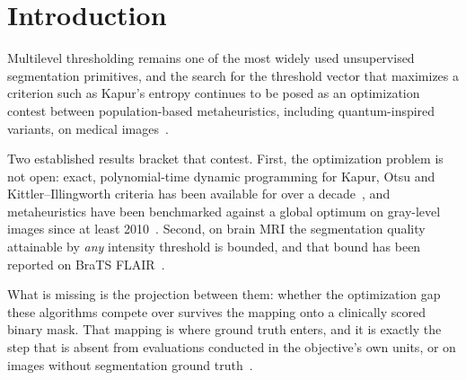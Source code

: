 %
\section{Introduction}
\label{sec:intro}

Multilevel thresholding remains one of the most widely used unsupervised
segmentation primitives, and the search for the threshold vector that maximizes
a criterion such as Kapur's entropy continues to be posed as an optimization
contest between population-based metaheuristics, including quantum-inspired
variants, on medical images~\cite{alnajdawi_scirep,mousavirad_kbs}.

Two established results bracket that contest. First, the optimization problem
is not open: exact, polynomial-time dynamic programming for Kapur, Otsu and
Kittler--Illingworth criteria has been available for over a
decade~\cite{menotti_ciarp,luessi_jei,merzban_eswa}, and metaheuristics have
been benchmarked against a global optimum on gray-level images since at least
2010~\cite{hammouche_eaai}. Second, on brain MRI the segmentation quality
attainable by \emph{any} intensity threshold is bounded, and that bound has
been reported on BraTS FLAIR~\cite{francois_jmiv}.

What is missing is the projection between them: whether the optimization gap
these algorithms compete over survives the mapping onto a clinically scored
binary mask. That mapping is where ground truth enters, and it is exactly the
step that is absent from evaluations conducted in the objective's own units, or
on images without segmentation ground truth~\cite{mousavirad_kbs,hegazy_metricbias}.


